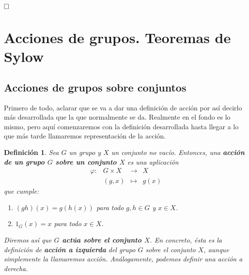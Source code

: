 \documentclass[12pt]{article}
\newtheorem{definition}[theorem]{Definición}
\begin{document}
$\hfill \square$

\section{Acciones de grupos. Teoremas de Sylow}

\subsection{Acciones de grupos sobre conjuntos}
Primero de todo, aclarar que se va a dar una definición de acción por así decirlo más desarrollada que la que normalmente se da. Realmente en el fondo es lo mismo, pero aquí comenzaremos con la definición desarrollada hasta llegar a lo que más tarde llamaremos representación de la acción.

\begin{definition} Sea $G$ un grupo y $X$ un conjunto no vacío. Entonces, una \textbf{acción de un grupo $G$ sobre un conjunto $X$} es una aplicación $$\begin{array}{rccl}
\varphi\colon &G \times X& \longrightarrow &X\\
&(g,x)& \longmapsto &g(x)
\end{array}
$$ que cumple: \begin{enumerate}
\item $(gh)(x) = g(h(x))$ para todo $g,h \in G$ y $x \in X$.
\item $1_{G}(x) = x$ para todo $x \in X$.
\end{enumerate}
Diremos así que \textbf{$G$ actúa sobre el conjunto $X$}. En concreto, ésta es la definición de \textbf{acción a izquierda} del grupo $G$ sobre el conjunto $X$, aunque simplemente la llamaremos acción. Análogamente, podemos definir una acción a derecha.
\end{definition}
\end{document}
